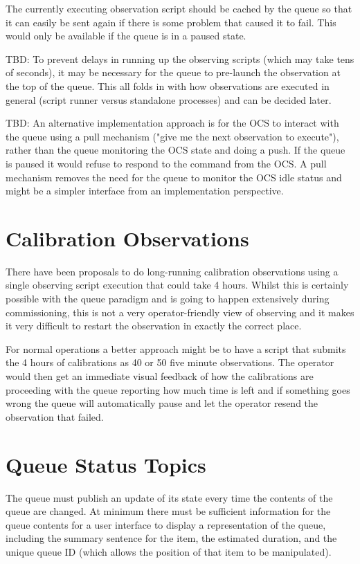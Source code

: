 \documentclass[TS,toc,lsstdraft]{lsstdoc}
\begin{document}
The currently executing observation script should be cached by the queue so that it can easily be sent again if there is some problem that caused it to fail.
This would only be available if the queue is in a paused state.

TBD: To prevent delays in running up the observing scripts (which may take tens of seconds), it may be necessary for the queue to pre-launch the observation at the top of the queue.
This all folds in with how observations are executed in general (script runner versus standalone processes) and can be decided later.

TBD: An alternative implementation approach is for the  OCS to interact with the queue using a pull mechanism ("give me the next observation to execute"), rather than the queue monitoring the OCS state and doing a push.
If the queue is paused it would refuse to respond to the command from the OCS.
A pull mechanism removes the need for the queue to monitor the OCS idle status and might be a simpler interface from an implementation perspective.

\section{Calibration Observations}

There have been proposals to do long-running calibration observations using a single observing script execution that could take 4 hours.
Whilst this is certainly possible with the queue paradigm and is going to happen extensively during commissioning, this is not a very operator-friendly view of observing and it makes it very difficult to restart the observation in exactly the correct place.

For normal operations a better approach might be to have a script that submits the 4 hours of calibrations as 40 or 50 five minute observations.
The operator would then get an immediate visual feedback of how the calibrations are proceeding with the queue reporting how much time is left and if something goes wrong the queue will automatically pause and let the operator resend the observation that failed.

\section{Queue Status Topics}

The queue must publish an update of its state every time the contents of the queue are changed.
At minimum there must be sufficient information for the queue contents for a user interface to display a representation of the queue, including the summary sentence for the item, the estimated duration, and the unique queue ID (which allows the position of that item to be manipulated).
\end{document}
